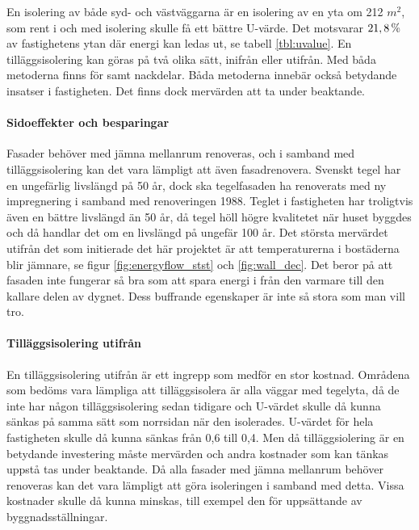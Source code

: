 En isolering av både syd- och västväggarna är en isolering av en yta om 212 $\unit{m^2}$, som rent i och med isolering skulle få ett bättre U-värde. Det motsvarar $\unit[21,8]{\%}$ av fastighetens ytan där energi kan ledas ut, se tabell \ref{tbl:uvalue}.
En tilläggsisolering kan göras på två olika sätt, inifrån eller utifrån. Med båda metoderna finns för samt nackdelar. Båda metoderna innebär också betydande insatser i fastigheten. Det finns dock mervärden att ta under beaktande. 

\paragraph{Sidoeffekter och besparingar}
Fasader behöver med jämna mellanrum renoveras, och i samband med tilläggsisolering kan det vara lämpligt att även fasadrenovera. Svenskt tegel har en ungefärlig livslängd på 50 år\cite{magnus}, dock ska tegelfasaden ha renoverats med ny impregnering i samband med renoveringen 1988. Teglet i fastigheten har troligtvis även en bättre livslängd än 50 år,  då tegel höll högre kvalitetet när huset byggdes och då handlar det om en livslängd på ungefär 100 år. Det största mervärdet utifrån det som initierade det här projektet är att temperaturerna i bostäderna blir jämnare, se figur \ref{fig:energyflow_stst} och \ref{fig:wall_dec}. Det beror på att fasaden inte fungerar så bra som att spara energi i från den varmare till den kallare delen av dygnet. Dess buffrande egenskaper är inte så stora som man vill tro.

\paragraph{Tilläggsisolering utifrån}
En tilläggsisolering utifrån är ett ingrepp som medför en stor kostnad. Områdena som bedöms vara lämpliga att tilläggsisolera är alla väggar med tegelyta, då de inte har någon tilläggsisolering sedan tidigare och U-värdet skulle då kunna sänkas på samma sätt som norrsidan när den isolerades. U-värdet för hela fastigheten skulle då kunna sänkas från 0,6 till 0,4. Men då tilläggsiolering är en betydande investering måste mervärden och andra kostnader som kan tänkas uppstå tas under beaktande. Då alla fasader med jämna mellanrum behöver renoveras kan det vara lämpligt att göra isoleringen i samband med detta. Vissa kostnader skulle då kunna minskas, till exempel den för uppsättande av byggnadsställningar.

